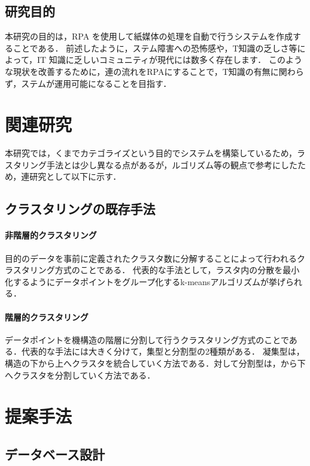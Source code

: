 \documentclass[a4j, 10pt, twocolumn]{ujarticle}
\begin{document}
\subsection{研究目的}

本研究の目的は，RPA を使用して紙媒体の処理を自動で行うシステムを作成することである．
前述したように，ステム障害への恐怖感や，T知識の乏しさ等によって，IT 知識に乏しいコミュニティが現代には数多く存在します．
このような現状を改善するために，連の流れをRPAにすることで，T知識の有無に関わらず，ステムが運用可能になることを目指す．

\section{関連研究}

本研究では，くまでカテゴライズという目的でシステムを構築しているため，ラスタリング手法とは少し異なる点があるが，ルゴリズム等の観点で参考にしたため，連研究として以下に示す．

\subsection{クラスタリングの既存手法}
\paragraph{非階層的クラスタリング}

目的のデータを事前に定義されたクラスタ数に分解することによって行われるクラスタリング方式のことである．
代表的な手法として，ラスタ内の分散を最小化するようにデータポイントをグループ化するk-meansアルゴリズムが挙げられる．

\paragraph{階層的クラスタリング}

データポイントを機構造の階層に分割して行うクラスタリング方式のことである．代表的な手法には大きく分けて，集型と分割型の2種類がある．
凝集型は，構造の下から上へクラスタを統合していく方法である．対して分割型は，から下へクラスタを分割していく方法である．

\section{提案手法}
\subsection{データベース設計}
\end{document}
